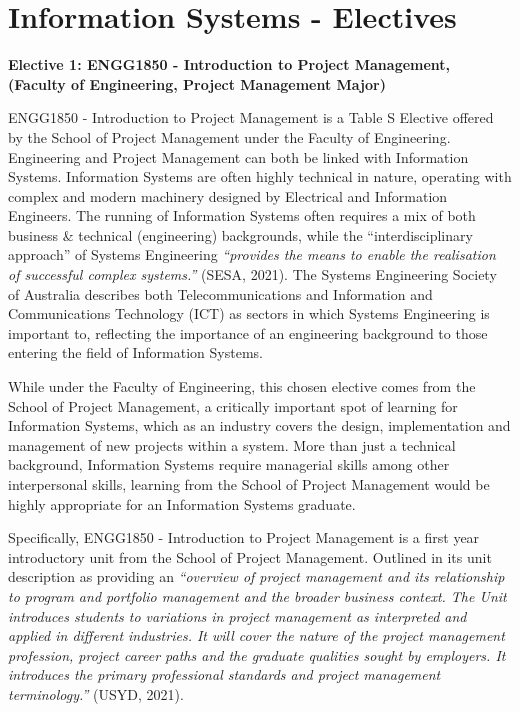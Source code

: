 \section{\textbf{Information Systems - Electives}}

\textbf{Elective 1: ENGG1850 - Introduction to Project Management, (Faculty of Engineering, Project Management Major)}


ENGG1850 - Introduction to Project Management is a Table S Elective offered by the School of Project Management under the Faculty of Engineering. Engineering and Project Management can both be linked with Information Systems. Information Systems are often highly technical in nature, operating with complex and modern machinery designed by Electrical and Information Engineers. The running of Information Systems often requires a mix of both business & technical (engineering) backgrounds, while the “interdisciplinary approach” of Systems Engineering \textit{“provides the means to enable the realisation of successful complex systems.”} (SESA, 2021). The Systems Engineering Society of Australia describes both Telecommunications and Information and Communications Technology (ICT) as sectors in which Systems Engineering is important to, reflecting the importance of an engineering background to those entering the field of Information Systems.

While under the Faculty of Engineering, this chosen elective comes from the School of Project Management, a critically important spot of learning for Information Systems, which as an industry covers the design, implementation and management of new projects within a system. More than just a technical background, Information Systems require managerial skills among other interpersonal skills, learning from the School of Project Management would be highly appropriate for an Information Systems graduate.


Specifically, ENGG1850 - Introduction to Project Management is a first year introductory unit from the School of Project Management. Outlined in its unit description as providing an \textit{“overview of project management and its relationship to program and portfolio management and the broader business context. The Unit introduces students to variations in project management as interpreted and applied in different industries. It will cover the nature of the project management profession, project career paths and the graduate qualities sought by employers. It introduces the primary professional standards and project management terminology.”} (USYD, 2021). 

